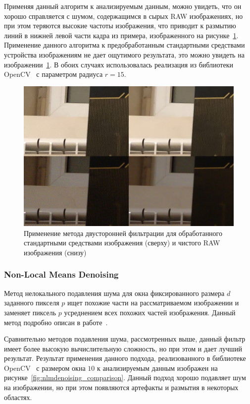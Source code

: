 Применяя данный алгоритм к анализируемым данным, можно увидеть, что он хорошо справляется с шумом, содержащимся в сырых RAW изображениях, но при этом теряются высокие частоты изображения, что приводит к размытию линий в нижней левой части кадра из примера, изображенного на рисунке~\ref{fig:bilinear_comparison}. Применение данного алгоритма к предобработанным стандартными средствами устройства изображениям не дает ощутимого результата, это можно увидеть на изображении~\ref{fig:bilinear_comparison}. В обоих случаях использовалась реализация из библиотеки OpenCV~\autocite{OpenCVLib} с параметром радиуса $r = 15$.

\begin{figure}[h]
	\centering
	\includegraphics[width=\textwidth]{img/bilinear_comparison}
	\caption{Применение метода двусторонней фильтрации для обработанного стандартными средствами изображения (сверху) и чистого RAW изображения (снизу)}
	\label{fig:bilinear_comparison}
\end{figure}

\subsubsection{Non-Local Means Denoising}
Метод нелокального подавления шума для окна фиксированного размера $d$ заданного пикселя $p$ ищет похожие части на рассматриваемом изображении и заменяет пиксель $p$ усреднением всех похожих частей изображения. Данный метод подробно описан в работе~\autocite{NonLocalMeansDenoising}.

Сравнительно методов подавления шума, рассмотренных выше, данный фильтр имеет более высокую вычислительную сложность, но при этом и дает лучший результат. Результат применения данного подхода, реализованного в библиотеке OpenCV~\autocite{OpenCVLib} с размером окна $10$ к анализируемым данным изображен на рисунке~\ref{fig:nlmdenoising_comparison}. Данный подход хорошо подавляет шум на изображении, но при этом появляются артефакты и размытия в некоторых областях.

